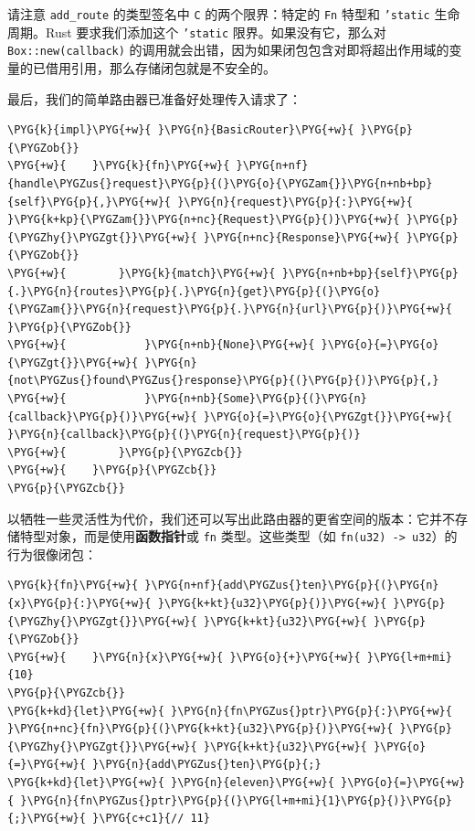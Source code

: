 \begin{myNote}
请注意 \texttt{add\_route} 的类型签名中 \texttt{C} 的两个限界：特定的 \texttt{Fn} 特型和 \texttt{'static} 生命周期。Rust 要求我们添加这个 \texttt{'static} 限界。如果没有它，那么对 \texttt{Box::new(callback)} 的调用就会出错，因为如果闭包包含对即将超出作用域的变量的已借用引用，那么存储闭包就是不安全的。
\end{myNote}

最后，我们的简单路由器已准备好处理传入请求了：

\begin{Verbatim}[commandchars=\\\{\},breaklines=true,breakanywhere=true,fontsize=\codefont,xleftmargin=17bp]
\PYG{k}{impl}\PYG{+w}{ }\PYG{n}{BasicRouter}\PYG{+w}{ }\PYG{p}{\PYGZob{}}
\PYG{+w}{    }\PYG{k}{fn}\PYG{+w}{ }\PYG{n+nf}{handle\PYGZus{}request}\PYG{p}{(}\PYG{o}{\PYGZam{}}\PYG{n+nb+bp}{self}\PYG{p}{,}\PYG{+w}{ }\PYG{n}{request}\PYG{p}{:}\PYG{+w}{ }\PYG{k+kp}{\PYGZam{}}\PYG{n+nc}{Request}\PYG{p}{)}\PYG{+w}{ }\PYG{p}{\PYGZhy{}\PYGZgt{}}\PYG{+w}{ }\PYG{n+nc}{Response}\PYG{+w}{ }\PYG{p}{\PYGZob{}}
\PYG{+w}{        }\PYG{k}{match}\PYG{+w}{ }\PYG{n+nb+bp}{self}\PYG{p}{.}\PYG{n}{routes}\PYG{p}{.}\PYG{n}{get}\PYG{p}{(}\PYG{o}{\PYGZam{}}\PYG{n}{request}\PYG{p}{.}\PYG{n}{url}\PYG{p}{)}\PYG{+w}{ }\PYG{p}{\PYGZob{}}
\PYG{+w}{            }\PYG{n+nb}{None}\PYG{+w}{ }\PYG{o}{=}\PYG{o}{\PYGZgt{}}\PYG{+w}{ }\PYG{n}{not\PYGZus{}found\PYGZus{}response}\PYG{p}{(}\PYG{p}{)}\PYG{p}{,}
\PYG{+w}{            }\PYG{n+nb}{Some}\PYG{p}{(}\PYG{n}{callback}\PYG{p}{)}\PYG{+w}{ }\PYG{o}{=}\PYG{o}{\PYGZgt{}}\PYG{+w}{ }\PYG{n}{callback}\PYG{p}{(}\PYG{n}{request}\PYG{p}{)}
\PYG{+w}{        }\PYG{p}{\PYGZcb{}}
\PYG{+w}{    }\PYG{p}{\PYGZcb{}}
\PYG{p}{\PYGZcb{}}
\end{Verbatim}

以牺牲一些灵活性为代价，我们还可以写出此路由器的更省空间的版本：它并不存储特型对象，而是使用\textbf{函数指针}或 \texttt{fn} 类型。这些类型（如 \texttt{fn(u32) -> u32}）的行为很像闭包：

\begin{Verbatim}[commandchars=\\\{\},breaklines=true,breakanywhere=true,fontsize=\codefont,xleftmargin=17bp]
\PYG{k}{fn}\PYG{+w}{ }\PYG{n+nf}{add\PYGZus{}ten}\PYG{p}{(}\PYG{n}{x}\PYG{p}{:}\PYG{+w}{ }\PYG{k+kt}{u32}\PYG{p}{)}\PYG{+w}{ }\PYG{p}{\PYGZhy{}\PYGZgt{}}\PYG{+w}{ }\PYG{k+kt}{u32}\PYG{+w}{ }\PYG{p}{\PYGZob{}}
\PYG{+w}{    }\PYG{n}{x}\PYG{+w}{ }\PYG{o}{+}\PYG{+w}{ }\PYG{l+m+mi}{10}
\PYG{p}{\PYGZcb{}}
\PYG{k+kd}{let}\PYG{+w}{ }\PYG{n}{fn\PYGZus{}ptr}\PYG{p}{:}\PYG{+w}{ }\PYG{n+nc}{fn}\PYG{p}{(}\PYG{k+kt}{u32}\PYG{p}{)}\PYG{+w}{ }\PYG{p}{\PYGZhy{}\PYGZgt{}}\PYG{+w}{ }\PYG{k+kt}{u32}\PYG{+w}{ }\PYG{o}{=}\PYG{+w}{ }\PYG{n}{add\PYGZus{}ten}\PYG{p}{;}
\PYG{k+kd}{let}\PYG{+w}{ }\PYG{n}{eleven}\PYG{+w}{ }\PYG{o}{=}\PYG{+w}{ }\PYG{n}{fn\PYGZus{}ptr}\PYG{p}{(}\PYG{l+m+mi}{1}\PYG{p}{)}\PYG{p}{;}\PYG{+w}{ }\PYG{c+c1}{// 11}
\end{Verbatim}


